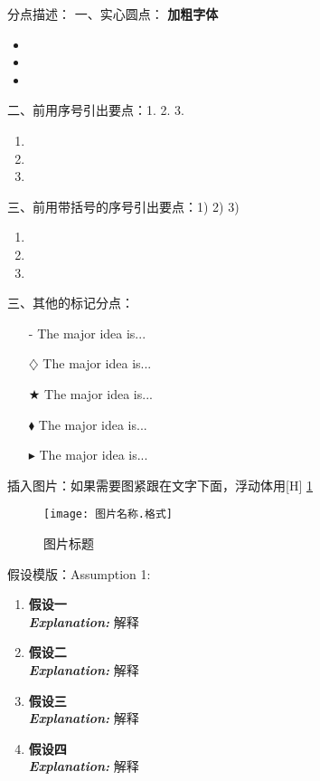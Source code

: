 分点描述：
一、实心圆点：
\textbf{加粗字体}
\begin{itemize}
	\setlength{\parsep}{0ex} 
	\setlength{\topsep}{2ex} 
	\setlength{\itemsep}{1ex} 
	\item 
	\item 
	\item 
\end{itemize}

二、前用序号引出要点：1. 2. 3.
\begin{enumerate}[\bfseries 1.]
	\setlength{\parsep}{0ex} %
	\setlength{\topsep}{0.5pt} %
	\setlength{\itemsep}{0.5pt} %
	\item 
	\item 
	\item 
\end{enumerate}

三、前用带括号的序号引出要点：1) 2) 3)
\begin{enumerate}[\bfseries 1)]
	\setlength{\parsep}{0ex} %
	\setlength{\topsep}{0.5pt} %
	\setlength{\itemsep}{0.5pt} %
	\item 
	\item 
	\item 
\end{enumerate}

三、其他的标记分点：\usepackage{amssymb}
\begin{itemize}
	\item[-] The major idea is...
	\item[$\diamondsuit$] The major idea is...
	\item[$\bigstar$] The major idea is...
	\item[$\blacklozenge$] The major idea is...
	\item[$\blacktriangleright$] The major idea is...
\end{itemize}

插入图片：如果需要图紧跟在文字下面，浮动体用[H]
\ref{pic}
\begin{figure}[htbp]  %
	\centering  %
	\texttt{[image: 图片名称.格式]} %
	\caption{图片标题}  
	\label{pic}
\end{figure}
\vspace{-0.5cm}


假设模版：Assumption 1:
\begin{enumerate}
	\item \textbf{假设一}\\
	\textbf{\textit{Explanation:}} 解释
	\item \textbf{假设二}\\
	\textbf{\textit{Explanation:}} 解释
	\item \textbf{假设三}\\
	\textbf{\textit{Explanation:}} 解释
	\item \textbf{假设四}\\
	\textbf{\textit{Explanation:}} 解释
\end{enumerate}

